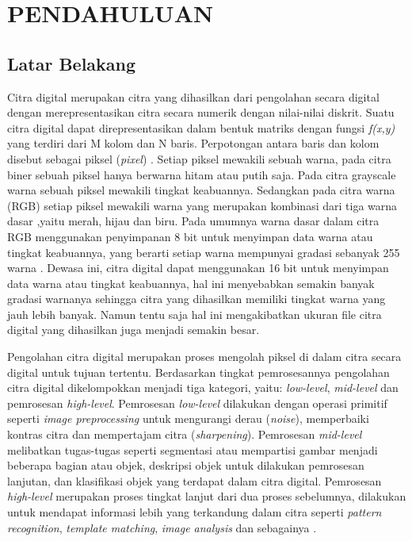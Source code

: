 
\chapter{PENDAHULUAN}

\section{Latar Belakang}
Citra digital merupakan citra yang dihasilkan dari pengolahan secara digital dengan merepresentasikan citra secara numerik dengan nilai-nilai diskrit. Suatu citra digital dapat direpresentasikan dalam bentuk matriks dengan fungsi \textit{f(x,y)} yang terdiri dari M kolom dan N baris. Perpotongan antara baris dan kolom disebut sebagai piksel (\textit{pixel}) . Setiap piksel mewakili sebuah warna, pada citra biner sebuah piksel hanya berwarna hitam atau putih saja. Pada citra grayscale warna sebuah piksel mewakili tingkat keabuannya. Sedangkan pada citra warna (RGB) setiap piksel mewakili warna yang merupakan kombinasi dari tiga warna dasar ,yaitu merah, hijau dan biru. Pada umumnya warna dasar dalam citra RGB menggunakan penyimpanan 8 bit untuk menyimpan data warna atau tingkat keabuannya, yang berarti setiap warna mempunyai gradasi sebanyak 255 warna . Dewasa ini, citra digital dapat menggunakan 16 bit untuk menyimpan data warna atau tingkat keabuannya, hal ini menyebabkan semakin banyak gradasi warnanya sehingga citra yang dihasilkan memiliki tingkat warna yang jauh lebih banyak. Namun tentu saja hal ini mengakibatkan ukuran file citra digital yang dihasilkan juga menjadi semakin besar.

Pengolahan citra digital merupakan proses mengolah piksel di dalam citra secara digital untuk tujuan tertentu. Berdasarkan tingkat pemrosesannya pengolahan citra digital dikelompokkan menjadi tiga kategori, yaitu: \textit{low-level}, \textit{mid-level} dan pemrosesan \textit{high-level}. Pemrosesan \textit{low-level} dilakukan dengan operasi primitif seperti \textit{image preprocessing} untuk mengurangi derau (\textit{noise}), memperbaiki kontras citra dan mempertajam citra (\textit{sharpening}). Pemrosesan \textit{mid-level} melibatkan tugas-tugas seperti segmentasi atau mempartisi gambar menjadi beberapa bagian atau objek, deskripsi objek untuk dilakukan pemrosesan lanjutan, dan klasifikasi objek yang terdapat dalam citra digital. Pemrosesan \textit{high-level} merupakan proses tingkat lanjut dari dua proses sebelumnya, dilakukan untuk mendapat informasi lebih yang terkandung dalam citra seperti \textit{pattern recognition}, \textit{template matching}, \textit{image analysis} dan sebagainya .


